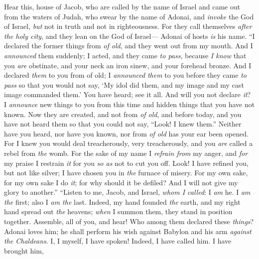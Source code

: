 \begin{biblechapter} %
 Hear this, house of Jacob, 
who are called by the name of Israel 
and came out from the waters of Judah, 
who swear by the name of Adonai, 
and \textit{invoke} the God of Israel, 
\textit{but} not in truth 
and not in righteousness.
\verse For they call themselves \textit{after the holy city}, 
and they lean on the God of Israel— 
Adonai of hosts \textit{is} his name.
\verse “I declared the former things from \textit{of old}, 
and they went out from my mouth. 
And I \textit{announced} them suddenly; 
I acted, and they came \textit{to pass},
\verse because \textit{I know} that you \textit{are} obstinate, 
and your neck an iron sinew, 
and your forehead bronze.
\verse And I declared \textit{them} to you from of old; 
I \textit{ announced} \textit{them} to you before they came \textit{to pass} 
so that you would not say, ‘My idol did them, 
and my image and my cast image commanded them.’
\verse You have heard; see it all. 
And will you not declare \textit{it}? 
I \textit{announce} new things to you from this time 
and hidden things that you have not known.
\verse Now they are created, and not from \textit{of old}, 
and before today, and you have not heard them 
so that you could not say, “Look! I knew them.”
\verse Neither have you heard, nor have you known, 
nor from \textit{of old} has your ear been opened. 
For I knew you would deal treacherously, very treacherously, 
and you \textit{are} called a rebel from \textit{the} womb.
\verse For the sake of my name I \textit{refrain from} my anger, 
and \textit{for} my praise I restrain \textit{it} for you 
\textit{so as} not to cut you off.
\verse Look! I have refined you, but not like silver; 
I have chosen you in \textit{the} furnace of misery.
\verse For my own sake, for my own sake I do \textit{it}; 
for why should it be defiled? 
And I will not give my glory to another.”
 “Listen to me, Jacob, 
and Israel, \textit{whom I called}: 
I \textit{am} he. I \textit{am the} first; 
also I \textit{am the} last.
\verse Indeed, my hand founded \textit{the} earth, 
and my right hand spread out \textit{the} heavens; 
\textit{when} I summon them, they stand in position together.
\verse Assemble, all of you, and hear! 
Who among them declared these \textit{things}? 
Adonai loves him; 
he shall perform his wish against Babylon 
and his arm \textit{against} \textit{the Chaldeans}.
\verse I, I myself, I have spoken! 
Indeed, I have called him. 
I have brought him, 

\end{biblechapter}
